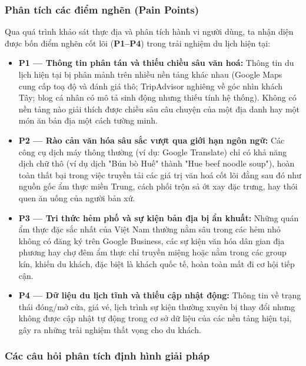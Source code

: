 \subsubsection{Phân tích các điểm nghẽn (Pain Points)}

Qua quá trình khảo sát thực địa và phân tích hành vi người dùng, ta nhận diện được bốn điểm nghẽn cốt lõi (\textbf{P1--P4}) trong trải nghiệm du lịch hiện tại:
\begin{itemize}
    \item \textbf{P1 --- Thông tin phân tán và thiếu chiều sâu văn hoá:} Thông tin du lịch hiện tại bị phân mảnh trên nhiều nền tảng khác nhau (Google Maps cung cấp toạ độ và đánh giá thô; TripAdvisor nghiêng về góc nhìn khách Tây; blog cá nhân có mô tả sinh động nhưng thiếu tính hệ thống). Không có nền tảng nào giải thích được chiều sâu câu chuyện của một địa danh hay một món ăn bản địa một cách tường minh.
    \item \textbf{P2 --- Rào cản văn hóa sâu sắc vượt qua giới hạn ngôn ngữ:} Các công cụ dịch máy thông thường (ví dụ: Google Translate) chỉ có khả năng dịch chữ thô (ví dụ dịch "Bún bò Huế" thành "Hue beef noodle soup"), hoàn toàn thất bại trong việc truyền tải các giá trị văn hoá cốt lõi đằng sau đó như nguồn gốc ẩm thực miền Trung, cách phối trộn sả ớt xay đặc trưng, hay thói quen ăn uống của người bản xứ.
    \item \textbf{P3 --- Tri thức hẻm phố và sự kiện bản địa bị ẩn khuất:} Những quán ẩm thực đặc sắc nhất của Việt Nam thường nằm sâu trong các hẻm nhỏ không có đăng ký trên Google Business, các sự kiện văn hóa dân gian địa phương hay chợ đêm ẩm thực chỉ truyền miệng hoặc nằm trong các group kín, khiến du khách, đặc biệt là khách quốc tế, hoàn toàn mất đi cơ hội tiếp cận.
    \item \textbf{P4 --- Dữ liệu du lịch tĩnh và thiếu cập nhật động:} Thông tin về trạng thái đóng/mở cửa, giá vé, lịch trình sự kiện thường xuyên bị thay đổi nhưng không được cập nhật tự động trong cơ sở dữ liệu của các nền tảng hiện tại, gây ra những trải nghiệm thất vọng cho du khách.
\end{itemize}

\subsubsection{Các câu hỏi phân tích định hình giải pháp}

